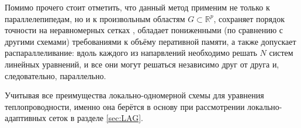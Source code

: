 Помимо прочего стоит отметить, что данный метод применим не только к параллелепипедам, но и к произвольным областям $G \subset \mathbb{R}^{p}$, сохраняет порядок точности на неравномерных сетках \cite{СамарскийНеравномерныеСетки}, обладает пониженными (по сравнению с другими схемами) требованиями к объёму перативной памяти, а также допускает распараллеливание: вдоль каждого из напарвлений необходимо решать $N$ систем линейных уравнений, и все они могут решаться независимо друг от друга и, следовательно, параллельно.

Учитывая все преимущества локально-одномерной схемы для уравнения теплопроводности, именно она берётся в основу при рассмотрении локально-адаптивных сеток в разделе \ref{sec:LAG}.